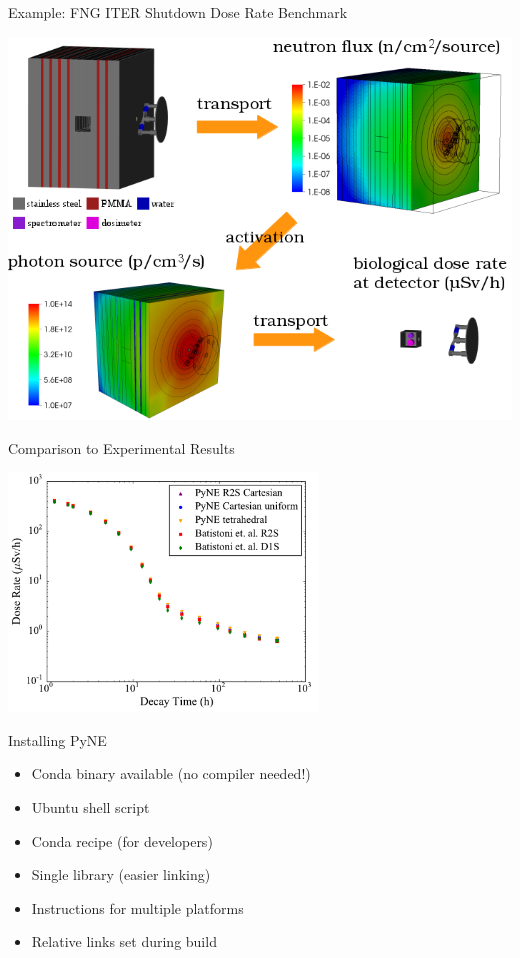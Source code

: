 \documentclass[xcolor=x11names,compress]{beamer}
\begin{document}
\begin{frame}{Example: FNG ITER Shutdown Dose Rate Benchmark}
\centerline{\includegraphics[height=0.85\textheight]{r2s_workflow.png}}
\end{frame}
\begin{frame}{Comparison to Experimental Results}
    \begin{center}
        \includegraphics[height=2.5in,clip]{comp.pdf}
    \end{center}
\end{frame}

\begin{frame}{Installing PyNE}
  \Large
  \begin{itemize}
      \item Conda binary available (no compiler needed!)
      \item Ubuntu shell script
      \item Conda recipe (for developers)
      \item Single library (easier linking)
      \item Instructions for multiple platforms
      \item Relative links set during build
  \end{itemize}
\end{frame}
\end{document}
